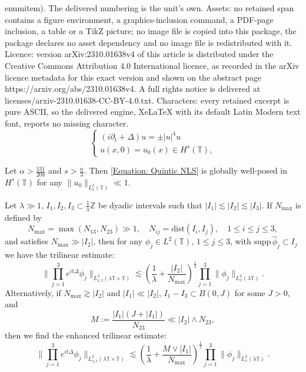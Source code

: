 \documentclass[10pt,a4paper]{amsart}
\begin{document}
enumitem). The delivered numbering is the unit's own. Assets: no retained span contains a figure environment, a graphics-inclusion command, a PDF-page inclusion, a table or a TikZ picture; no image file is copied into this package, the package declares no asset dependency and no image file is redistributed with it. Licence: version arXiv:2310.01638v4 of this article is distributed under the Creative Commons Attribution 4.0 International licence, as recorded in the arXiv licence metadata for this exact version and shown on the abstract page https://arxiv.org/abs/2310.01638v4. A full rights notice is delivered at licenses/arxiv-2310.01638-CC-BY-4.0.txt. Characters: every retained excerpt is pure ASCII, so the delivered engine, XeLaTeX with its default Latin Modern text font, reports no missing character.
\begin{equation}\label{Equation: Quintic NLS}
    \begin{cases}
        (i\partial_t+\Delta)u = \pm |u|^4u\\
        u(x,0) = u_0(x)\in H^s(\mathbb{T}),
    \end{cases}
\end{equation}

\begin{theorem}\label{Theorem: GWP theorem}
    Let $\alpha > \frac{131}{208}$ and $s > \frac{\alpha}{3}$. Then \eqref{Equation: Quintic NLS} is globally well-posed in $H^s(\mathbb{T})$ for any $\|u_0\|_{L^2_{x}(\mathbb{T})}\ll 1$.
\end{theorem}

\begin{proposition}\label{Proposition: Trilinear Free Estimate}
    Let $\lambda\gg 1$, $I_1, I_2, I_3\subset \frac{1}{\lambda}\mathbb{Z}$ be dyadic intervals such that $|I_1|\lesssim |I_2|\lesssim |I_3|$. If $N_{\max}$ is defined by
    \[
    N_{\max} = \max(N_{13}, N_{23})\gg 1, \quad N_{ij} = \mathrm{dist}(I_i,I_j),\quad 1\leq i\leq  j\leq 3,
    \]
    and satisfies $N_{\max}\gg |I_2|$, then for any $\phi_j\in L^2(\mathbb{T})$, $1\leq j\leq 3$, with $\mathrm{supp}\,\widehat{\phi}_j\subset I_j$ we have the trilinear estimate:
    \begin{equation*}\label{Equation: Trilinear base}
\|\prod_{j=1}^3e^{it\Delta}\phi_j\|_{L^2_{x,t}(\lambda\mathbb{T}\times\mathbb{T})}\lesssim \left(\frac{1}{\lambda} + \frac{|I_2|}{N_{\max}}\right)^\frac{1}{2}\prod_{j=1}^3\|\phi_j\|_{L^2_x(\lambda\mathbb{T})}.
    \end{equation*}
    Alternatively, if $N_{\max}\gtrsim |I_2|$ and $|I_1|\ll|I_2|$, $I_1-I_3\subset B(0, J)$ for some $J > 0$, and
 \begin{equation}\label{Condition: M condition}
M := \frac{|I_1|(J+|I_1|)}{N_{23}}\ll |I_2|\wedge N_{23},
 \end{equation}
    then we find the enhanced trilinear estimate:
    \begin{equation*}\label{Equation: Trilinear HHL}
\|\prod_{j=1}^3e^{it\Delta}\phi_j\|_{L^2_{x,t}(\lambda\mathbb{T}\times\mathbb{T})}\lesssim \left(\frac{1}{\lambda} + \frac{M\vee |I_1|}{N_{\max}}\right)^\frac{1}{2}\prod_{j=1}^3\|\phi_j\|_{L^2_x(\lambda\mathbb{T})}.
    \end{equation*}
\end{proposition}
\end{document}

